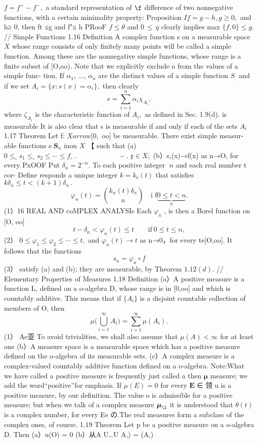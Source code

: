 $f=f^{+}-f^{-},$ a standard representation of $\boldsymbol{\f}$ difference of two nonnegative functions, with a certain minimality property: Proposition $I f=g-h,g\geq0,$ and h≥ 0, then ft ≤g and f"≤ h PRooF $\scriptstyle{f\leq\theta}$ and $\scriptstyle0\,\leq\,q$ clearly implies max $\{f,0\}\leq g.$ // Simple Functions 1.16 Definition A complex function s on a measurable space $X$ whose range consists of only finitely many points will be called a simple function. Among these are the nonnegative simple functions, whose range is a finite subset of [O,oo). Note that we explicitly exclude o from the values of a simple func- tion. If $\alpha_{1},\,\ldots,\,\alpha_{n}$ are the distinct values of a simple function $S_{\mathrm{,}}$ and if we set $A_{i}=\{x\colon s(x)=\alpha_{i}\},$ then clearly $$ s=\sum_{i=1}^{n}\alpha_{i}\chi_{A_{i}}, $$ where $\zeta_{A_{i}}$ is the characteristic function of $A_{i},$ as defined in Sec. 1.9(d). is measurable It is also clear that s is measurable if and only if each of the sets $A_{i}$ 1.17 Theorem Let f: $X{ arrow}[0,$ oo] be measurable. There exist simple measur- able functions s ${\boldsymbol{S}}_{n}$ inon $X$ 【 such that (a) $0\leq_{\circ}s_{1}\leq_{\circ}s_{2}\leq\cdots\leq f_{\circ}~.\qquad\qquad\qquad-.$ ${\mathfrak{x}}\in X;$ (b）s,(x)→f(x) as n→O, for every PxOOF Put $\delta_{n}=2^{-n}.$ To each positive integer $\;n$ and each real number t cor- Define responds a unique integer $k=k_{\mathrm{s}}(t)$ that satisfies $k\delta_{n}\leq t<(k+1)\delta_{n}\,.$ $$ \varphi_{n}(t)={\binom{k_{n}(t)\delta_{n}}{n}}\quad{\textrm{i f}}\underbrace{0\leq t<n}_{n}. $$ (1）16 REAL AND coMPLEX ANALYSIs Each $\varphi_{n}$ , is then a Borel function on [O, oo] $$ t-\delta_{n}<\varphi_{n}(t)\leq t\qquad{\mathrm{if~}}0\leq t\leq n, $$ (2） $0\leq\varphi_{1}\leq\varphi_{2}\leq\cdots\leq t,$ and $\varphi_{n}(t)\to t$ as n→0，for every te[O,oo]. It follows that the functions $$ s_{n}=\varphi_{n}\circ f $$ (3） satisfy (a) and (b); they are measurable, by Theorem $1.12(d).$ // Elementary Properties of Measures 1.18 Definition (a）A positive measure is a function L, defined on a o-algebra D, whose range is in [0,oo] and which is countably additive. This means that if $\scriptstyle\{A_{i}\}$ is a disjoint countable collection of members of O, then $$ \mu{\biggl(}\bigcup_{i=1}^{\infty}A_{i}{\biggr)}=\sum_{i=1}^{\infty}\mu(A_{i}). $$ (1） Ae亚 To avoid trivialities, we shall also assume that $\mu(A)<\infty$ for at least one (b）A measure space is a measurable space which has a positive measure defined on the o-algebra of its measurable sets. (c）A complex measure is a complex-valued countably additive function defined on a o-algebra. Note:What we have called a positive measure is frequently just called a then ${\boldsymbol{\mu}}$ measure; we add the word“positive”for emphasis. If $\mu(E)=0$ for every $\boldsymbol{E}$ ∈ 领 u is a positive measure, by our definition. The value o is admissible for a positive measure; but when we talk of a complex measure ${\boldsymbol{\mu}}_{\l}$ it is understood that $\scriptstyle{\theta(t)}$ is a complex number, for every Ee の.The real measures form a subclass of the complex ones, of course. 1.19 Theorem Let p be a positive measure on a o-algebra D. Then (a）u(O) = 0 (b）从A U…U A,) = (A,) 